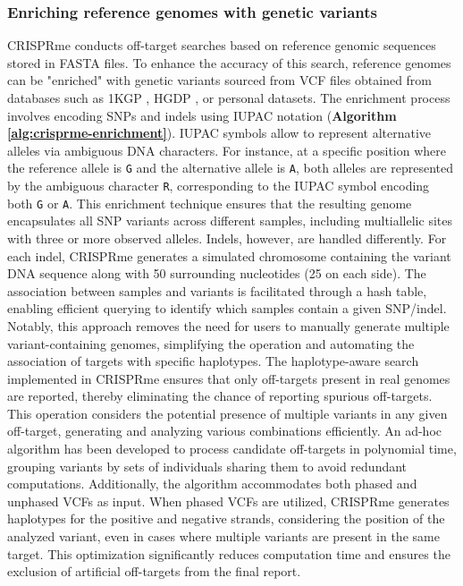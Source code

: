 \documentclass[a4paper, titlepage, openright]{book}
\newcommand{\crisprme}{CRISPRme\xspace}
\begin{document}
\subsubsection{Enriching reference genomes with genetic variants}
\crisprme conducts off-target searches based on reference genomic sequences stored in FASTA files. To enhance the accuracy of this search, reference genomes can be "enriched" with genetic variants sourced from VCF files obtained from databases such as 1KGP \citep{10002015global}, HGDP \citep{bergstrom2020insights}, or personal datasets. The enrichment process involves encoding SNPs and indels using IUPAC notation (\textbf{Algorithm \ref{alg:crisprme-enrichment}}). IUPAC symbols allow to represent alternative alleles via ambiguous DNA characters. For instance, at a specific position where the reference allele is \texttt{G} and the alternative allele is \texttt{A}, both alleles are represented by the ambiguous character \texttt{R}, corresponding to the IUPAC symbol encoding both \texttt{G} or \texttt{A}. This enrichment technique ensures that the resulting genome encapsulates all SNP variants across different samples, including multiallelic sites with three or more observed alleles. Indels, however, are handled differently. For each indel, \crisprme generates a simulated chromosome containing the variant DNA sequence along with 50 surrounding nucleotides (25 on each side). The association between samples and variants is facilitated through a hash table, enabling efficient querying to identify which samples contain a given SNP/indel. Notably, this approach removes the need for users to manually generate multiple variant-containing genomes, simplifying the operation and automating the association of targets with specific haplotypes. The haplotype-aware search implemented in CRISPRme ensures that only off-targets present in real genomes are reported, thereby eliminating the chance of reporting spurious off-targets. This operation considers the potential presence of multiple variants in any given off-target, generating and analyzing various combinations efficiently. An ad-hoc algorithm has been developed to process candidate off-targets in polynomial time, grouping variants by sets of individuals sharing them to avoid redundant computations. Additionally, the algorithm accommodates both phased and unphased VCFs as input. When phased VCFs are utilized, CRISPRme generates haplotypes for the positive and negative strands, considering the position of the analyzed variant, even in cases where multiple variants are present in the same target. This optimization significantly reduces computation time and ensures the exclusion of artificial off-targets from the final report.
\end{document}
